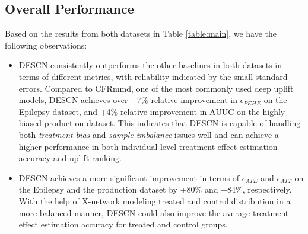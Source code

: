 \documentclass[sigconf]{acmart}
\begin{document}
\subsection{Overall Performance}
Based on the results from both datasets in Table \ref{table:main}, we have the following observations:
\begin{itemize}
    \item DESCN consistently outperforms the other baselines in both datasets in terms of different metrics, with reliability indicated by the small standard errors. Compared to CFRmmd, one of the most commonly used deep uplift models, DESCN achieves over +7\% relative improvement in $\epsilon_{PEHE}$ on the Epilepsy dataset, and +4\% relative improvement in AUUC on the highly biased production dataset. This indicates that DESCN is capable of handling both \textit{treatment bias} and \textit{sample imbalance} issues well and can achieve a higher performance in both individual-level treatment effect estimation accuracy and uplift ranking.
    \item DESCN achieves a more significant improvement in terms of $\epsilon_{ATE}$ and $\epsilon_{ATT}$ on the Epilepsy and the production dataset by +80\% and +84\%, respectively. With the help of X-network modeling treated and control distribution in a more balanced manner, DESCN could also improve the average treatment effect estimation accuracy for treated and control groups.
    
\end{itemize}
\end{document}
